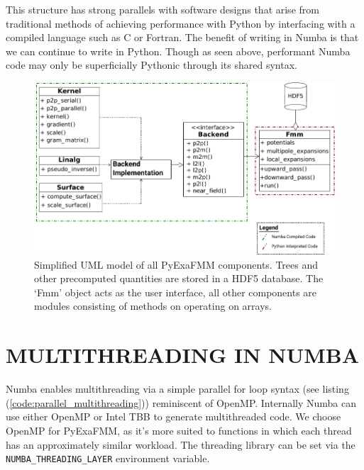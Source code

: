 \documentclass{IEEEcsmag}
\begin{document}
This structure has strong parallels with software designs that arise from traditional methods of achieving performance with Python by interfacing with a compiled language such as C or Fortran. The benefit of writing in Numba is that we can continue to write in Python. Though as seen above, performant Numba code may only be superficially Pythonic through its shared syntax.

\begin{figure}
    \centerline{\includegraphics {figures/software.pdf}}
    \caption{Simplified UML model of all PyExaFMM components. Trees and other precomputed quantities are stored in a HDF5 database. The `Fmm' object acts as the user interface, all other components are modules consisting of methods on operating on arrays.}
    \label{fig:design}
\end{figure}

\section{MULTITHREADING IN NUMBA}

Numba enables multithreading via a simple parallel for loop syntax (see listing (\ref{code:parallel_multithreading})) reminiscent of OpenMP. Internally Numba can use either OpenMP or Intel TBB to generate multithreaded code. We choose OpenMP for PyExaFMM, as it's more suited to functions in which each thread has an approximately similar workload. The threading library can be set via the \lstinline{NUMBA_THREADING_LAYER} environment variable.
\end{document}

